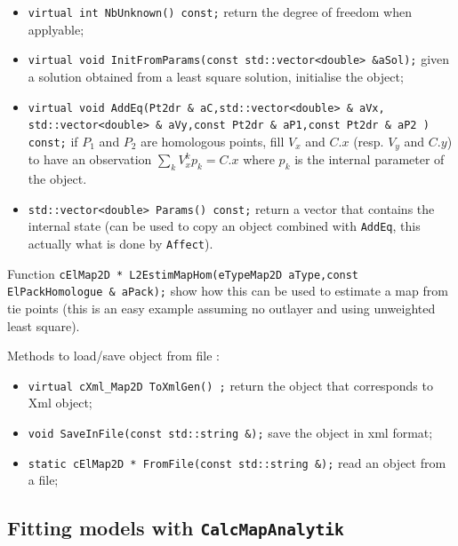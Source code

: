 \begin{itemize}
    \item {\tt virtual int   NbUnknown() const;} return the degree of freedom when applyable;

    \item {\tt   virtual void  InitFromParams(const std::vector<double> \&aSol);} given a solution obtained
          from a least square solution, initialise the object; 

    \item {\tt     virtual void  AddEq(Pt2dr \& aC,std::vector<double> \& aVx,
                   std::vector<double> \& aVy,const Pt2dr \& aP1,const Pt2dr \& aP2 ) const;}
          if $P_1$ and $P_2$ are homologous points, fill  $V_x$ and $C.x$ (resp. $V_y$ and $C.y$) 
          to have an observation $ \sum\limits_k V_x^k p_k = C.x $ where $p_k$  is the internal parameter
          of the object.

    \item {\tt   std::vector<double> Params() const;} return a vector that contains the internal
          state  (can be used to copy an object combined with {\tt AddEq}, this actually what is
          done by {\tt Affect}).
 
\end{itemize}

Function {\tt cElMap2D * L2EstimMapHom(eTypeMap2D aType,const ElPackHomologue \& aPack);} show how this
can be used to estimate a map from tie points (this is an easy example assuming no outlayer and
using unweighted least square).


Methods to load/save object from file :

\begin{itemize}
   \item {\tt virtual cXml\_Map2D    ToXmlGen() ;} return the \CPP object that corresponds to  
         Xml object;

   \item {\tt void  SaveInFile(const std::string \&);} save the object in xml format;

   \item {\tt  static cElMap2D * FromFile(const std::string \&);} read an object from a file;
\end{itemize}



\subsection{Fitting models with {\tt CalcMapAnalytik}}


